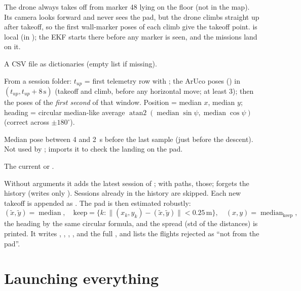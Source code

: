 The drone always takes off from marker 48 lying on the floor (not in the map). Its camera looks forward and never
sees the pad, but the drone climbs straight up after takeoff, so the first wall-marker poses of each climb give the
takeoff point.  is local (in ); the EKF starts there before any marker is
seen, and the missions land on it.

A CSV file as dictionaries (empty list if missing).

From a session folder: $t_{up}$ = first telemetry row with ; the ArUco poses
() in $(t_{up}, t_{up} + 8\,\text{s})$ (takeoff and climb, before any horizontal move; at least 3);
then the poses of the \emph{first second} of that window. Position = median $x$, median $y$; heading = circular
median-like average $\operatorname{atan2}(\operatorname{median}\sin\psi, \operatorname{median}\cos\psi)$ (correct
across $\pm180^\circ$).

Median pose between 4 and 2~s before the last  sample (just before the descent). Not used by
;  imports it to check the landing on the pad.

The current  or \code{\{\}}.

Without arguments it adds the latest session of ; with paths, those;
 forgets the history (writes only ). Sessions already in the history are skipped.
Each new takeoff is appended as . The pad is then estimated robustly:
\[
(\tilde x, \tilde y) = \operatorname{median}, \quad
\text{keep} = \lbrace k : \lVert (x_k, y_k) - (\tilde x, \tilde y)\rVert < 0.25\,\text{m}\rbrace, \quad
(x, y) = \operatorname{median}_{\text{keep}},
\]
the heading by the same circular formula, and the spread (std of the distances) is printed. It writes ,
, , ,  and the full , and lists the flights rejected as
``not from the pad''.

\section{Launching everything}
\label{sec:mapping-launch}

